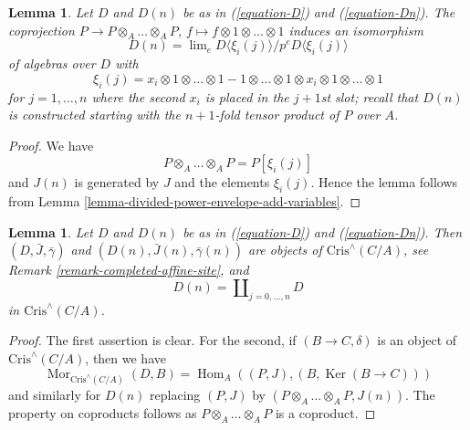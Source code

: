 \documentclass{stacks-project}
\theoremstyle{plain}
\newtheorem{lemma}[subsection]{Lemma}
\theoremstyle{definition}
\theoremstyle{remark}
\numberwithin{equation}{subsection}
\def\lim{\mathop{\mathrm{lim}}\nolimits}
\def\Hom{\mathop{\mathrm{Hom}}\nolimits}
\def\Mor{\mathop{\mathrm{Mor}}\nolimits}
\def\Ker{\mathop{\mathrm{Ker}}}
\begin{document}
\begin{lemma}
\label{lemma-structure-Dn}
Let $D$ and $D(n)$ be as in (\ref{equation-D}) and (\ref{equation-Dn}).
The coprojection $P \to P \otimes_A \ldots \otimes_A P$,
$f \mapsto f \otimes 1 \otimes \ldots \otimes 1$
induces an isomorphism
\begin{equation}
\label{equation-structure-Dn}
D(n) = \lim_e D\langle \xi_i(j) \rangle/p^eD\langle \xi_i(j) \rangle
\end{equation}
of algebras over $D$ with
$$
\xi_i(j) = x_i \otimes 1 \otimes \ldots \otimes 1 -
1 \otimes \ldots \otimes 1 \otimes x_i \otimes 1 \otimes \ldots \otimes 1
$$
for $j = 1, \ldots, n$ where the second $x_i$ is placed in the $j + 1$st
slot; recall that $D(n)$ is constructed starting with the
$n + 1$-fold tensor product of $P$ over $A$.
\end{lemma}

\begin{proof}
We have
$$
P \otimes_A \ldots \otimes_A P = P[\xi_i(j)]
$$
and $J(n)$ is generated by $J$ and the elements $\xi_i(j)$.
Hence the lemma follows from
Lemma \ref{lemma-divided-power-envelope-add-variables}.
\end{proof}

\begin{lemma}
\label{lemma-property-Dn}
Let $D$ and $D(n)$ be as in (\ref{equation-D}) and (\ref{equation-Dn}).
Then $(D, \bar J, \bar\gamma)$ and $(D(n), \bar J(n), \bar\gamma(n))$
are objects of $\text{Cris}^\wedge(C/A)$, see
Remark \ref{remark-completed-affine-site}, and
$$
D(n) = \coprod\nolimits_{j = 0, \ldots, n} D
$$
in $\text{Cris}^\wedge(C/A)$.
\end{lemma}

\begin{proof}
The first assertion is clear. For the second, if $(B \to C, \delta)$ is an
object of $\text{Cris}^\wedge(C/A)$, then we have
$$
\Mor_{\text{Cris}^\wedge(C/A)}(D, B) = 
\Hom_A((P, J), (B, \Ker(B \to C)))
$$
and similarly for $D(n)$ replacing $(P, J)$ by
$(P \otimes_A \ldots \otimes_A P, J(n))$. The property on coproducts follows
as $P \otimes_A \ldots \otimes_A P$ is a coproduct.
\end{proof}
\end{document}
